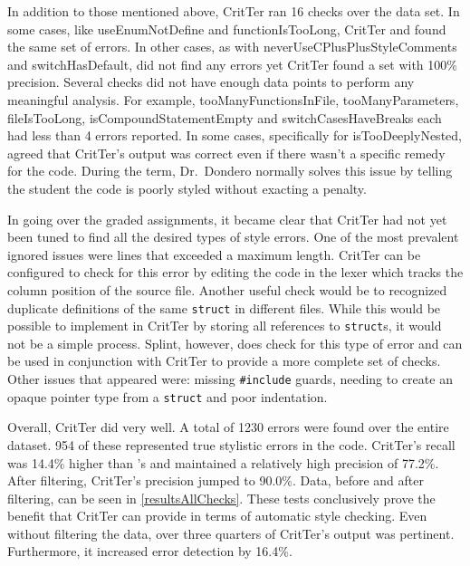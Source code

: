 \documentclass[12pt]{report}
\newcommand{\programName}{CritTer\xspace}
\begin{document}
In addition to those mentioned above, \programName ran 16 checks over the data set. In some cases, 
like useEnumNotDefine and functionIsTooLong, \programName and \human found the same set of 
errors. In other cases, as with neverUseCPlusPlusStyleComments and switchHasDefault, \human did not 
find any errors yet \programName found a set with 100\% precision. Several checks did not have enough 
data points to perform any meaningful analysis. For example, tooManyFunctionsInFile, 
tooManyParameters, fileIsTooLong, isCompoundStatementEmpty and switchCasesHaveBreaks each 
had less than 4 errors reported. In some cases, specifically for isTooDeeplyNested, \human agreed that 
\programName's output was correct even if there wasn't a specific remedy for the code. During the term, 
Dr.\ Dondero normally solves this issue by telling the student the code is poorly styled without exacting a 
penalty.

In going over the graded assignments, it became clear that \programName had not yet been tuned to find 
all the desired types of style errors. One of the most prevalent ignored issues were lines that exceeded a 
maximum length. \programName can be configured to check for this error by editing the code in the lexer 
which tracks the column position of the source file. Another useful check would be to recognized 
duplicate definitions of the same \lstinline{struct} in different files. While this would be possible to 
implement in \programName by storing all references to \lstinline{struct}s, it would not be a simple 
process. Splint, however, does check for this type of error and can be used in conjunction with 
\programName to provide a more complete set of checks. Other issues that appeared were: missing 
\lstinline{#include} guards, needing to create an opaque pointer type from a \lstinline{struct} and poor 
indentation.

Overall, \programName did very well. A total of 1230 errors were found over the entire dataset. 
954 of these represented true stylistic errors in the code. \programName's recall was 14.4\% 
higher than \human's and maintained a relatively high precision of 77.2\%. After filtering, 
\programName's precision jumped to 90.0\%. Data, before and after filtering, can be seen in 
\autoref{resultsAllChecks}. These tests conclusively prove the benefit that \programName can provide in 
terms of automatic style checking. Even without filtering the data, over three quarters of \programName's 
output was pertinent. Furthermore, it increased error detection by 16.4\%.
\end{document}
